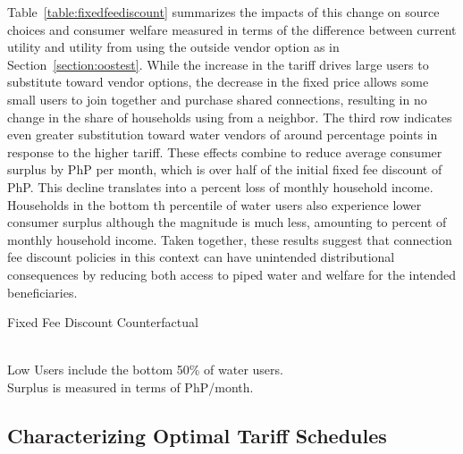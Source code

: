 \documentclass[12pt]{article}
\begin{document}
Table~\ref{table:fixedfeediscount} summarizes the impacts of this change on source choices and consumer welfare measured in terms of the difference between current utility and utility from using the outside vendor option as in Section~\ref{section:oostest}.  While the increase in the tariff drives large users to substitute toward vendor options, the decrease in the fixed price allows some small users to join together and purchase shared connections, resulting in no change in the share of households using from a neighbor.  The third row indicates even greater substitution toward water vendors of around percentage points in response to the higher tariff.  These effects combine to reduce average consumer surplus by PhP per month, which is over half of the initial fixed fee discount of PhP.  This decline translates into a percent loss of monthly household income.  Households in the bottom \unskip th percentile of water users also experience lower consumer surplus although the magnitude is much less, amounting to percent of monthly household income.  Taken together, these results suggest that connection fee discount policies in this context can have unintended distributional consequences by reducing both access to piped water and welfare for the intended beneficiaries. %
\begin{table}
	\centering
	\caption{Fixed Fee Discount Counterfactual}\label{table:fixedfeediscount}
	 \\
	\footnotesize{Low Users include the bottom 50\% of water users. \\
	Surplus is measured in terms of PhP/month.}
\end{table}

\subsection{Characterizing Optimal Tariff Schedules}
\end{document}
